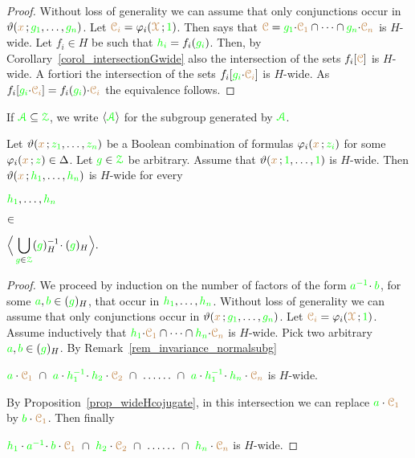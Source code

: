 \begin{proof}
  Without loss of generality we can assume that only conjunctions occur in $\vartheta({\color{brown} x}\,;{\color{green} g_1},\dots,{\color{green} g_n})$.
  Let ${\color{brown}\EuScript C_i}=\varphi_i({\color{brown}\EuScript X}\,;{\color{green} 1})$.
  Then  says that ${\color{brown}\EuScript C}={\color{green} g_1}{\cdot}{\color{brown}\EuScript C_1}\cap\dots\cap{\color{green}g_n}{\cdot}{\color{brown}\EuScript C_n}$ is $H$-wide.
  Let $f_i\in H$ be such that ${\color{green} h_i}=f_i({\color{green} g_i})$.
  Then, by Corollary~\ref{corol_intersectionGwide} also the intersection of the sets $f_i[{\color{brown}\EuScript C}]$ is $H$-wide.
  A fortiori the intersection of the sets $f_i[{\color{green} g_i}{\cdot}{\color{brown}\EuScript C_i}]$ is $H$-wide.
  As $f_i[{\color{green} g_i}{\cdot}{\color{brown}\EuScript C_i}]=f_i({\color{green} g_i}){\cdot}{\color{brown}\EuScript C_i}$ the equivalence follows.
\end{proof}

If ${\color{green}\EuScript A}\subseteq{\color{green}\EuScript Z}$, we write \emph{$\langle{\color{green}\EuScript A}\rangle$} for the subgroup generated by ${\color{green}\EuScript A}$.

\begin{proposition}\label{prop_stabilizer1}
  \def\medrel#1{\parbox[t]{5ex}{$\displaystyle\hfil #1$}}
  \def\ceq#1#2#3{\parbox[t]{15ex}{$\displaystyle #1$}\medrel{#2}{$\displaystyle #3$}}
  Let $\vartheta({\color{brown} x}\,;{\color{green} z_1},\dots,{\color{green} z_n})$ be a Boolean combination of formulas $\varphi_i({\color{brown} x}\,;{\color{green} z_i})$ for some $\varphi_i({\color{brown} x}\,;{\color{green} z})\in\Delta$.
  Let ${\color{green} g}\in{\color{green}\EuScript Z}$ be arbitrary.
  Assume that $\vartheta({\color{brown} x}\,;{\color{green} 1},\dots,{\color{green} 1})$ is $H$-wide.
  Then $\vartheta({\color{brown} x}\,;{\color{green} h_1},\dots,{\color{green} h_n})$ is $H$-wide for every 
  
  \ceq{\hfill{\gr h_1},\dots,{\gr h_n}}{\in}{\Big\<\bigcup_{{\gr g}\in\grZ}({\gr g})_H^{-1}\!\cdot({\gr g})_H\Big\>.}
\end{proposition}

\begin{proof}
  We proceed by induction on the number of factors of the form ${\color{green} a^{-1}}\!\cdot{\color{green}b}$, for some ${\color{green} a},{\color{green} b}\in({\color{green} g})_H$, that occur in ${\color{green} h_1},\dots,{\color{green} h_n}$.
  Without loss of generality we can assume that only conjunctions occur in $\vartheta({\color{brown} x}\,;{\color{green} g_1},\dots,{\color{green} g_n})$.
  Let ${\color{brown}\EuScript C_i}=\varphi_i({\color{brown}\EuScript X}\,;{\color{green} 1})$.
  Assume inductively that ${\color{green} h_1}{\cdot}{\color{brown}\EuScript C_1}\cap\dots\cap{\color{green}h_n}{\cdot}{\color{brown}\EuScript C_n}$ is $H$-wide.
  Pick two arbitrary ${\color{green} a},{\color{green} b}\in({\color{green} g})_H$.
  By Remark~\ref{rem_invariance_normalsubg}
  
  \hspace*{7ex}${\gr a}\cdot{\mr\C_1}\ \cap\ {\gr a}\cdot{\gr h_1^{-1}}\!\cdot{\gr h_2}\cdot{\mr\C_2}\ \cap\ \dots\dots\ \cap\ {\gr a}\cdot{\gr h_1^{-1}}\!\cdot{\gr h_n}\cdot{\mr\C_n}$ is $H$-wide.
  
  By Proposition~\ref{prop_wideHcojugate}, in this intersection we can replace ${\color{green} a}\cdot{\color{brown}\EuScript C_1}$ by ${\color{green} b}\cdot{\color{brown}\EuScript C_1}$.
  Then finally 

  \hspace*{7ex}${\gr h_1}\cdot{\gr a^{-1}}\!\cdot{\gr b}\cdot{\mr\C_1}\ \cap\ {\gr h_2}\cdot{\mr\C_2}\ \cap\ \dots\dots\ \cap\ {\gr h_n}\cdot{\mr\C_n}$ is $H$-wide.
\end{proof}

